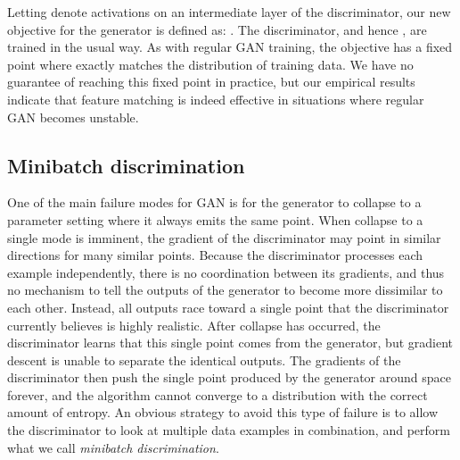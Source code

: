 \documentclass{article} \usepackage{nips14submit_e,times}
\begin{document}
Letting  denote activations on an intermediate layer of the discriminator,
our new objective for the generator is defined as:
.
The discriminator, and hence , are trained in the usual way.
As with regular GAN training, the objective has a fixed point where 
exactly matches the distribution of training data.
We have no guarantee of reaching this fixed point in practice, but our empirical
results indicate that feature matching is indeed effective in situations where
regular GAN becomes unstable.

\subsection{Minibatch discrimination}
\label{sec:minibatch}
One of the main failure modes for GAN is for the generator to collapse to a parameter setting where it
always emits the same point.
When collapse to a single mode is imminent, the gradient of the
discriminator may point in similar directions for many similar points.
Because the discriminator processes each example independently, there is
no coordination between its gradients, and thus no mechanism to tell the
outputs of the generator to become more dissimilar to each other.
Instead, all outputs race toward a single point that the discriminator
currently believes is highly realistic.
After collapse has occurred, the discriminator learns that this single
point comes from the generator, but gradient descent is unable to separate
the identical outputs. The gradients of the discriminator then push the
single point produced by the generator around space forever, and the
algorithm cannot converge to a distribution with the correct amount of entropy.
An obvious strategy to avoid this type of failure is to allow the discriminator to look at multiple data examples in combination, and perform what we call \emph{minibatch discrimination}.
\end{document}
